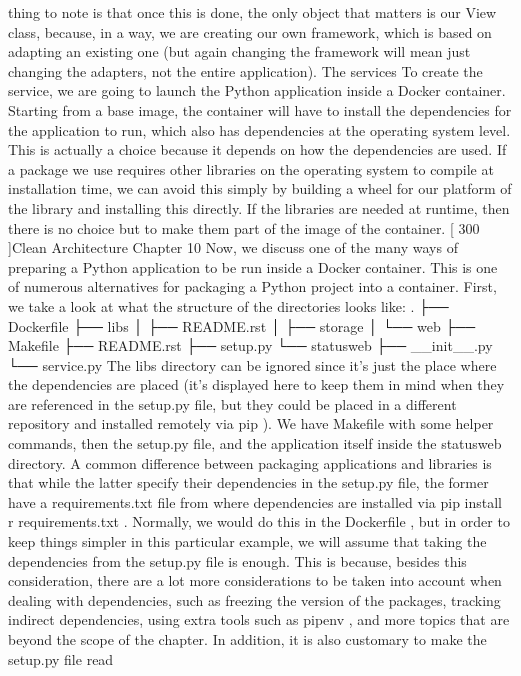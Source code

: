 \documentclass[a4paper,10pt,english]{sphinxmanual}
\begin{document}
thing to note is that once this is done, the only object that matters is our View class, because,
in a way, we are creating our own framework, which is based on adapting an existing one
(but again changing the framework will mean just changing the adapters, not the entire
application).
The services
To create the service, we are going to launch the Python application inside a Docker
container. Starting from a base image, the container will have to install the dependencies
for the application to run, which also has dependencies at the operating system level.
This is actually a choice because it depends on how the dependencies are used. If a package
we use requires other libraries on the operating system to compile at installation time, we
can avoid this simply by building a wheel for our platform of the library and installing this
directly. If the libraries are needed at runtime, then there is no choice but to make them part
of the image of the container.
{[} 300 {]}Clean Architecture
Chapter 10
Now, we discuss one of the many ways of preparing a Python application to be run inside a
Docker container. This is one of numerous alternatives for packaging a Python project into
a container. First, we take a look at what the structure of the directories looks like:
.
├── Dockerfile
├── libs
│
├── README.rst
│
├── storage
│
└── web
├── Makefile
├── README.rst
├── setup.py
└── statusweb
├── \_\_init\_\_.py
└── service.py
The libs directory can be ignored since it’s just the place where the dependencies are
placed (it’s displayed here to keep them in mind when they are referenced in the setup.py
file, but they could be placed in a different repository and installed remotely via pip ).
We have Makefile with some helper commands, then the setup.py file, and the
application itself inside the statusweb directory. A common difference between packaging
applications and libraries is that while the latter specify their dependencies in
the setup.py file, the former have a requirements.txt file from where dependencies are
installed via pip install \sphinxhyphen{}r requirements.txt . Normally, we would do this in the
Dockerfile , but in order to keep things simpler in this particular example, we will assume
that taking the dependencies from the setup.py file is enough. This is because, besides this
consideration, there are a lot more considerations to be taken into account when dealing
with dependencies, such as freezing the version of the packages, tracking indirect
dependencies, using extra tools such as pipenv , and more topics that are beyond the scope
of the chapter. In addition, it is also customary to make the setup.py file read
\end{document}
